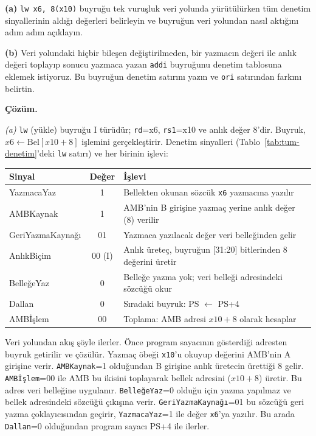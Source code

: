 \begin{ornek}[6.2]
\textbf{(a)} \texttt{lw x6, 8(x10)} buyruğu tek vuruşluk veri yolunda yürütülürken tüm denetim sinyallerinin aldığı değerleri belirleyin ve buyruğun veri yolundan nasıl aktığını adım adım açıklayın.

\textbf{(b)} Veri yolundaki hiçbir bileşen değiştirilmeden, bir yazmacın değeri ile anlık değeri toplayıp sonucu yazmaca yazan \texttt{addi} buyruğunu denetim tablosuna eklemek istiyoruz. Bu buyruğun denetim satırını yazın ve \texttt{ori} satırından farkını belirtin.

\textbf{Çözüm.}

\emph{(a)} \texttt{lw} (yükle) buyruğu I türüdür; \texttt{rd}=x6, \texttt{rs1}=x10 ve anlık değer 8'dir. Buyruk, $x6 \leftarrow \text{Bel}[x10 + 8]$ işlemini gerçekleştirir. Denetim sinyalleri (Tablo~\ref{tab:tum-denetim}'deki \texttt{lw} satırı) ve her birinin işlevi:

\begin{center}
\begin{tabular}{lcp{7.2cm}}
\toprule
\textbf{Sinyal} & \textbf{Değer} & \textbf{İşlevi} \\
\midrule
YazmacaYaz & 1 & Bellekten okunan sözcük \texttt{x6} yazmacına yazılır \\
AMBKaynak & 1 & AMB'nin B girişine yazmaç yerine anlık değer (8) verilir \\
GeriYazmaKaynağı & 01 & Yazmaca yazılacak değer veri belleğinden gelir \\
AnlıkBiçim & 00 (I) & Anlık üreteç, buyruğun [31:20] bitlerinden 8 değerini üretir \\
BelleğeYaz & 0 & Belleğe yazma yok; veri belleği adresindeki sözcüğü okur \\
Dallan & 0 & Sıradaki buyruk: PS $\leftarrow$ PS+4 \\
AMBİşlem & 00 & Toplama: AMB adresi $x10 + 8$ olarak hesaplar \\
\bottomrule
\end{tabular}
\end{center}

Veri yolundan akış şöyle ilerler. Önce program sayacının gösterdiği adresten buyruk getirilir ve çözülür. Yazmaç öbeği \texttt{x10}'u okuyup değerini AMB'nin A girişine verir. \texttt{AMBKaynak}=1 olduğundan B girişine anlık üretecin ürettiği 8 gelir. \texttt{AMBİşlem}=00 ile AMB bu ikisini toplayarak bellek adresini ($x10+8$) üretir. Bu adres veri belleğine uygulanır. \texttt{BelleğeYaz}=0 olduğu için yazma yapılmaz ve bellek adresindeki sözcüğü çıkışına verir. \texttt{GeriYazmaKaynağı}=01 bu sözcüğü geri yazma çoklayıcısından geçirir, \texttt{YazmacaYaz}=1 ile değer \texttt{x6}'ya yazılır. Bu arada \texttt{Dallan}=0 olduğundan program sayacı PS+4 ile ilerler.


\end{ornek}
